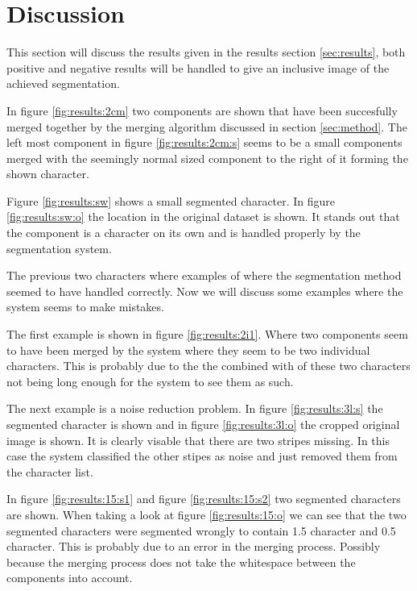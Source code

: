 \newpage
\section{Discussion} %
\label{sec:discussion}

This section will discuss the results given in the results section \ref{sec:results}, both positive and negative results will be handled to give an inclusive image of the achieved segmentation.


In figure \ref{fig:results:2cm} two components are shown that have been succesfully merged together by the merging algorithm discussed in section \ref{sec:method}. The left most component in figure \ref{fig:results:2cm:s} seems to be a small components merged with the seemingly normal sized component to the right of it forming the shown character.

Figure \ref{fig:results:sw} shows a small segmented character. In figure \ref{fig:results:sw:o} the location in the original dataset is shown. It stands out that the component is a character on its own and is handled properly by the segmentation system.

The previous two characters where examples of where the segmentation method seemed to have handled correctly. Now we will discuss some examples where the system seems to make mistakes.

The first example is shown in figure \ref{fig:results:2i1}. Where two components seem to have been merged by the system where they seem to be two individual characters. This is probably due to the the combined with of these two characters not being long enough for the system to see them as such.

The next example is a noise reduction problem. In figure \ref{fig:results:3l:s} the segmented character is shown and in figure \ref{fig:results:3l:o} the cropped original image is shown. It is clearly visable that there are two stripes missing. In this case the system classified the other stipes as noise and just removed them from the character list.

In figure \ref{fig:results:15:s1} and figure \ref{fig:results:15:s2} two segmented characters are shown. When taking a look at figure \ref{fig:results:15:o} we can see that the two segmented characters were segmented wrongly to contain 1.5 character and 0.5 character. This is probably due to an error in the merging process. Possibly because the merging process does not take the whitespace between the components into account.

